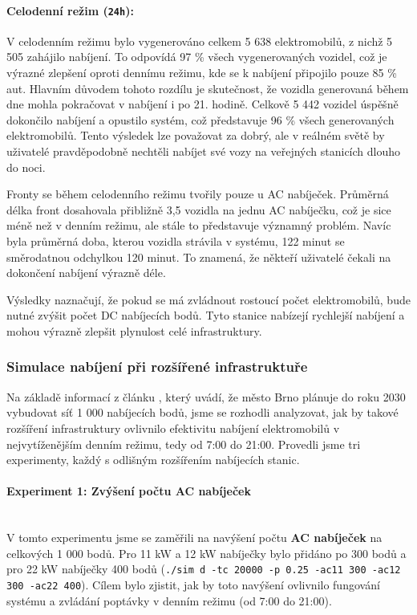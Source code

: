 \documentclass[a4paper,11pt]{article}
\begin{document}
\paragraph{Celodenní režim (\texttt{24h}):} 
V celodenním režimu bylo vygenerováno celkem 5 638 elektromobilů, z nichž 5 505 zahájilo nabíjení. To odpovídá 97 \% všech vygenerovaných vozidel, což je výrazné zlepšení oproti dennímu režimu, kde se k nabíjení připojilo pouze 85 \% aut. Hlavním důvodem tohoto rozdílu je skutečnost, že vozidla generovaná během dne mohla pokračovat v nabíjení i po 21. hodině. Celkově 5 442 vozidel úspěšně dokončilo nabíjení a opustilo systém, což představuje 96 \% všech generovaných elektromobilů. Tento výsledek lze považovat za dobrý, ale v reálném světě by uživatelé pravděpodobně nechtěli nabíjet své vozy na veřejných stanicích dlouho do noci.

Fronty se během celodenního režimu tvořily pouze u AC nabíječek. Průměrná délka front dosahovala přibližně 3,5 vozidla na jednu AC nabíječku, což je sice méně než v denním režimu, ale stále to představuje významný problém. Navíc byla průměrná doba, kterou vozidla strávila v systému, 122 minut se směrodatnou odchylkou 120 minut. To znamená, že někteří uživatelé čekali na dokončení nabíjení výrazně déle.

Výsledky naznačují, že pokud se má zvládnout rostoucí počet elektromobilů, bude nutné zvýšit počet DC nabíjecích bodů. Tyto stanice nabízejí rychlejší nabíjení a mohou výrazně zlepšit plynulost celé infrastruktury.


\subsubsection{Simulace nabíjení při rozšířené infrastruktuře}

Na základě informací z článku \cite{ev_growth}, který uvádí, že město Brno plánuje do roku 2030 vybudovat síť 1 000 nabíjecích bodů, jsme se rozhodli analyzovat, jak by takové rozšíření infrastruktury ovlivnilo efektivitu nabíjení elektromobilů v nejvytíženějším denním režimu, tedy od 7:00 do 21:00. Provedli jsme tri experimenty, každý s odlišným rozšířením nabíjecích stanic.


\paragraph{Experiment 1: Zvýšení počtu AC nabíječek\\\\}
V tomto experimentu jsme se zaměřili na navýšení počtu \textbf{AC nabíječek} na celkových 1 000 bodů. Pro 11 kW a 12 kW nabíječky bylo přidáno po 300 bodů a pro 22 kW nabíječky 400 bodů (\texttt{./sim d -tc 20000 -p 0.25 -ac11 300 -ac12 300 -ac22 400}). Cílem bylo zjistit, jak by toto navýšení ovlivnilo fungování systému a zvládání poptávky v denním režimu (od 7:00 do 21:00).
\end{document}

